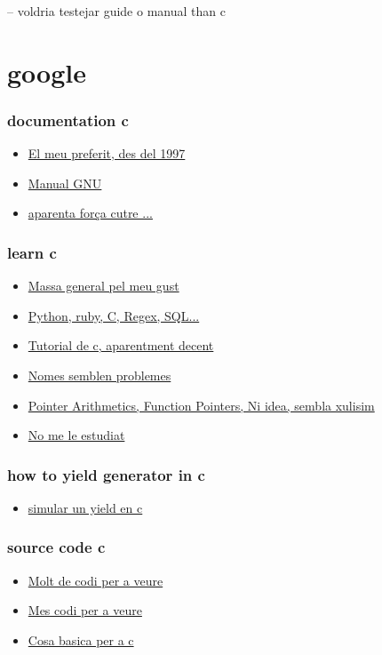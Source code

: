 \documentclass[a4paper,10pt]{article}
\begin{document}
-- voldria testejar guide o manual than c\\
\part{google}
\section{documentation c}
\begin{itemize}
\item \href{http://www.acm.uiuc.edu/webmonkeys/book/c_guide/}{El meu preferit, des del 1997}
\item \href{http://www.gnu.org/software/gnu-c-manual/gnu-c-manual.html}{Manual GNU}
\item \href{http://www.cs.cf.ac.uk/Dave/C_index.html}{aparenta força cutre ...}
\end{itemize}

\section{learn c}
\begin{itemize}
\item \href{http://www.cprogramming.com/}{Massa general pel meu gust}
\item \href{http://c.learncodethehardway.org/}{Python, ruby, C, Regex, SQL...}
\item \href{http://www.cprogramming.com/tutorial/c-tutorial.html}{Tutorial de c, aparentment decent}
\item \href{http://c.learncodethehardway.org/book/}{Nomes semblen problemes}
\item \href{http://www.learn-c.org/}{Pointer Arithmetics, Function Pointers, Ni idea, sembla xulisim}
\item \href{http://www.c4learn.com/c-programming/c-ansi/}{No me le estudiat}
\end{itemize}

\section{how to yield generator in c}
\begin{itemize}
\item \href{http://eli.thegreenplace.net/2012/04/05/implementing-a-generatoryield-in-a-python-c-extension}{simular un yield en c}
\end{itemize}

\section{source code c}
\begin{itemize}
\item \href{http://www.programmingsimplified.com/c-games-and-projects}{Molt de codi per a veure}
\item \href{http://www.programmingsimplified.com/c-program-examples}{Mes codi per a veure}
\item \href{http://www.programiz.com/c-programming/examples/source-code-output}{Cosa basica per a c}
\end{itemize}
\end{document}
